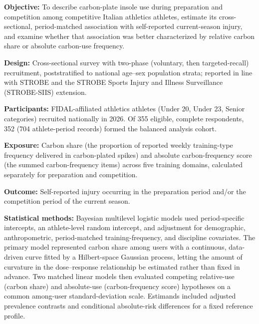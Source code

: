 \textbf{Objective:} To describe carbon-plate insole use during preparation and competition among competitive Italian athletics athletes, estimate its cross-sectional, period-matched association with self-reported current-season injury, and examine whether that association was better characterized by relative carbon share or absolute carbon-use frequency.

\textbf{Design:} Cross-sectional survey with two-phase (voluntary, then targeted-recall) recruitment, poststratified to national age--sex population strata; reported in line with STROBE and the STROBE Sports Injury and Illness Surveillance (STROBE-SIIS) extension.

\textbf{Participants:} FIDAL-affiliated athletics athletes (Under 20, Under 23, Senior categories) recruited nationally in 2026. Of 355 eligible, complete respondents, 352 (704 athlete-period records) formed the balanced analysis cohort.

\textbf{Exposure:} Carbon share (the proportion of reported weekly training-type frequency delivered in carbon-plated spikes) and absolute carbon-frequency score (the summed carbon-frequency items) across five training domains, calculated separately for preparation and competition.

\textbf{Outcome:} Self-reported injury occurring in the preparation period and/or the competition period of the current season.

\textbf{Statistical methods:} Bayesian multilevel logistic models used period-specific intercepts, an athlete-level random intercept, and adjustment for demographic, anthropometric, period-matched training-frequency, and discipline covariates. The primary model represented carbon share among users with a continuous, data-driven curve fitted by a Hilbert-space Gaussian process, letting the amount of curvature in the dose--response relationship be estimated rather than fixed in advance. Two matched linear models then evaluated competing relative-use (carbon share) and absolute-use (carbon-frequency score) hypotheses on a common among-user standard-deviation scale. Estimands included adjusted prevalence contrasts and conditional absolute-risk differences for a fixed reference profile.

